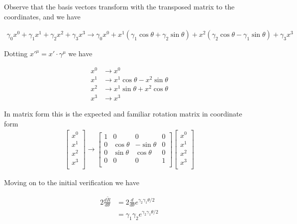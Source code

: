 \documentclass{article}
\begin{document}
Observe that the basis vectors transform with the transposed matrix to the coordinates, and we have

\begin{align*}
\gamma_0 x^0
+ \gamma_1 x^1
+ \gamma_2 x^2
+ \gamma_3 x^3 
\rightarrow
\gamma_0 x^0
+x^1 (\gamma_1 \cos\theta + \gamma_2 \sin\theta)
+x^2 (\gamma_2 \cos\theta - \gamma_1 \sin\theta)
+\gamma_3 x^3
\end{align*}

Dotting ${x'}^\mu = x' \cdot \gamma^\mu$ we have

\begin{align*}
x^0 &\rightarrow x^0 \\
x^1 &\rightarrow x^1 \cos\theta - x^2 \sin\theta \\
x^2 &\rightarrow x^1 \sin\theta +x^2 \cos\theta  \\
x^3 &\rightarrow x^3
\end{align*}

In matrix form this is the expected and familiar rotation matrix in coordinate form
\begin{align*}
\begin{bmatrix}
x^0 \\
x^1 \\
x^2 \\
x^3 \\
\end{bmatrix}
\rightarrow
\begin{bmatrix}
1 & 0 & 0 & 0 \\
0 & \cos\theta & -\sin\theta & 0 \\
0 & \sin\theta & \cos\theta & 0 \\
0 & 0 & 0 & 1 \\
\end{bmatrix}
\begin{bmatrix}
x^0 \\
x^1 \\
x^2 \\
x^3 \\
\end{bmatrix}
\end{align*}

Moving on to the initial verification we have

\begin{align*}
2 \frac{d\tilde{R}}{d\theta} 
&= 2\frac{d}{d\theta} e^{\gamma_2\gamma_1 \theta/2} \\
&= \gamma_1 \gamma_2 e^{\gamma_2\gamma_1 \theta/2} \\
\end{align*}
\end{document}

